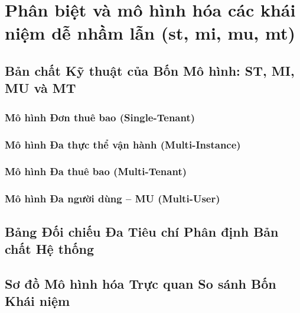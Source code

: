 \par{}
\section{Phân biệt và mô hình hóa các khái niệm dễ nhầm lẫn (st, mi, mu, mt)}
\label{outline:1:concept-models:1}

\par{}
\subsection{Bản chất Kỹ thuật của Bốn Mô hình: ST, MI, MU và MT}
\label{outline:1:concept-models:2}

\par{}
\subsubsection{Mô hình Đơn thuê bao (Single-Tenant)}
\label{outline:1:concept-models:3}

\par{}
\subsubsection{Mô hình Đa thực thể vận hành (Multi-Instance)}
\label{outline:1:concept-models:4}

\par{}
\subsubsection{Mô hình Đa thuê bao (Multi-Tenant)}
\label{outline:1:concept-models:5}

\par{}
\subsubsection{Mô hình Đa người dùng – MU (Multi-User)}
\label{outline:1:concept-models:6}

\par{}
\subsection{Bảng Đối chiếu Đa Tiêu chí Phân định Bản chất Hệ thống}
\label{outline:1:concept-models:7}

\par{}
\subsection{Sơ đồ Mô hình hóa Trực quan So sánh Bốn Khái niệm}
\label{outline:1:concept-models:8}
